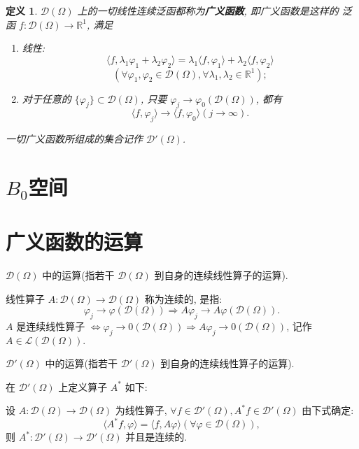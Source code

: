 \documentclass{ctexrep}
\newtheorem{defn}{定义}[section]
\newcommand{\SCRL}{\mathscr{L}}
\newcommand{\D}{\mathscr{D}}
\newcommand{\R}{\mathbb{R}}
\newcommand{\DO}{\mathscr{D}(\Omega)}
\begin{document}
\begin{defn}
$\DO$ 上的一切线性连续泛函都称为\textbf{广义函数}, 即广义函数是这样的
泛函 $f : \DO \to \R^1$, 满足
\renewcommand{\labelenumi}{(\theenumi)}
\begin{enumerate}
\item 线性:
\[
\langle f, \lambda_1\varphi_1 + \lambda_2\varphi_2\rangle =
\lambda_1\langle f,\varphi_1\rangle + \lambda_2\langle
f,\varphi_2\rangle
\]
\[
(\forall \varphi_1, \varphi_2 \in \DO, \forall \lambda_1, \lambda_2
\in \R^1);
\]
\item 对于任意的 $\{\varphi_j\} \subset \DO$, 只要 $\varphi_j \to
  \varphi_0 (\DO)$, 都有
\[
\langle f,\varphi_j\rangle \to \langle f,\varphi_0\rangle (j \to \infty).
\]
\end{enumerate}
一切广义函数所组成的集合记作 $\D'(\Omega)$.
\end{defn}

\section{$B_0$空间}

\section{广义函数的运算}

$\D(\Omega)$ 中的运算(指若干 $\D(\Omega)$ 到自身的连续线性算子的运算).

线性算子 $A : \D(\Omega) \to \D(\Omega)$ 称为连续的, 是指:
\[
\varphi_j \rightarrow \varphi (\DO) \Rightarrow A\varphi_j \rightarrow
A\varphi (\DO).
\]
$A$ 是连续线性算子 $\Leftrightarrow \varphi_j \rightarrow 0 (\DO)
\Rightarrow A\varphi_j \rightarrow 0 (\DO)$, 记作 $A \in \SCRL(\DO).$

$\D'(\Omega)$ 中的运算(指若干 $\D'(\Omega)$ 到自身的连续线性算子的运算).

在 $\D'(\Omega)$ 上定义算子 $A^*$ 如下:

设 $A : \DO \to \DO$ 为线性算子, $\forall f \in \D'(\Omega), A^*f \in
\D'(\Omega)$ 由下式确定:
\[
\langle A^*f, \varphi \rangle = \langle f, A\varphi\rangle (\forall \varphi \in \DO),
\]
则 $A^* : \D'(\Omega) \to \D'(\Omega)$ 并且是连续的.
\end{document}
